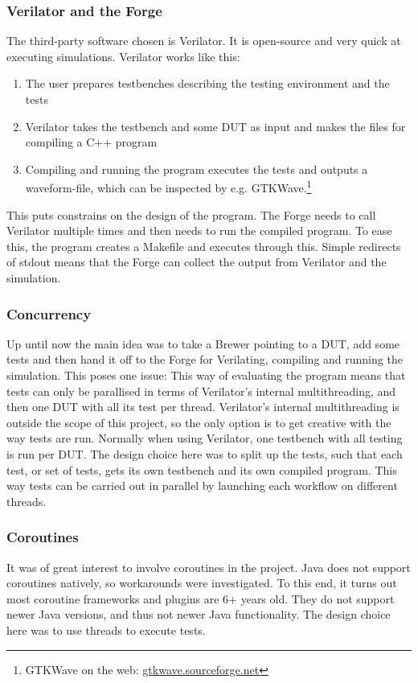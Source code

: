 \subsubsection{Verilator and the Forge}
The third-party software chosen is Verilator. It is open-source and very quick at executing simulations. Verilator works like this:
\begin{enumerate}
    \item The user prepares testbenches describing the testing environment and the tests
    \item Verilator takes the testbench and some DUT as input and makes the files for compiling a C++ program
    \item Compiling and running the program executes the tests and outputs a waveform-file, which can be inspected by e.g. GTKWave.\footnote{GTKWave on the web: \href{https://gtkwave.sourceforge.net/}{gtkwave.sourceforge.net}}
\end{enumerate}

This puts constrains on the design of the program. The Forge needs to call Verilator multiple times and then needs to run the compiled program. To ease this, the program creates a Makefile and executes through this. Simple redirects of stdout means that the Forge can collect the output from Verilator and the simulation. 
\subsubsection{Concurrency}
Up until now the main idea was to take a Brewer pointing to a DUT, add some tests and then hand it off to the Forge for Verilating, compiling and running the simulation. This poses one issue: This way of evaluating the program means that tests can only be parallised in terms of Verilator's internal multithreading, and then one DUT with all its test per thread. Verilator's internal multithreading is outside the scope of this project, so the only option is to get creative with the way tests are run. Normally when using Verilator, one testbench with all testing is run per DUT. The design choice here was to split up the tests, such that each test, or set of tests, gets its own testbench and its own compiled program. This way tests can be carried out in parallel by launching each workflow on different threads.
\subsubsection{Coroutines}
It was of great interest to involve coroutines in the project. Java does not support coroutines natively, so workarounds were investigated. To this end, it turns out most coroutine frameworks and plugins are 6+ years old. They do not support newer Java versions, and thus not newer Java functionality. The design choice here was to use threads to execute tests.
